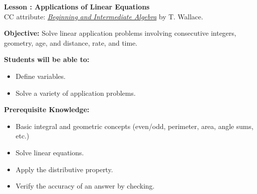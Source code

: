 \documentclass[12pt]{article}
\theoremstyle{definition}
\begin{document}
{\bf \large Lesson : Applications of Linear Equations}\label{les:applications_of_linear_applications}\\
CC attribute: \href{http://www.wallace.ccfaculty.org/book/book.html}{\it{Beginning and Intermediate Algebra}} by T. Wallace. \hfill \doclicenseImage[imagewidth=5em]\\
\par
{\bf Objective:} Solve linear application problems involving consecutive integers, geometry, age, and distance, rate, and time.\\
\par
{\bf Students will be able to:}
\begin{itemize}
	\item Define variables.
	\item Solve a variety of application problems.
\end{itemize}
{\bf Prerequisite Knowledge:}
\begin{itemize}
	\item Basic integral and geometric concepts (even/odd, perimeter, area, angle sums, etc.)
	\item Solve linear equations.
	\item Apply the distributive property.
	\item Verify the accuracy of an answer by checking.
\end{itemize}
\hrulefill
\end{document}
